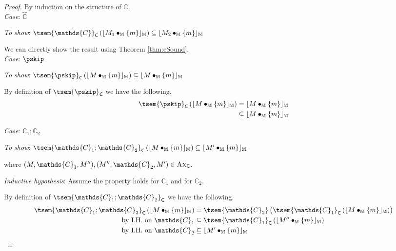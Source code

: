 {\parindent0pt
\begin{proof}
By induction on the structure of $\mathds{C}$. \\

\textit{Case}: $\mathds{\hat{C}}$

\textit{To show}: $\tsem{\hat{\mathds{C}}}_\mathsf{C} \left( \lfloor M_1 \bullet_\mathbb{M} \{m\} \rfloor_\mathbb{M} \right) \subseteq \lfloor M_2 \bullet_\mathbb{M} \{m\} \rfloor_\mathbb{M}$

We can directly show the result using Theorem \ref{thm:eSound}. \\

\textit{Case}: $\pskip$

\textit{To show}: $\tsem{\pskip}_\mathsf{C} \left( \lfloor M \bullet_\mathbb{M} \{m\} \rfloor_\mathbb{M} \right) \subseteq \lfloor M \bullet_\mathbb{M} \{m\} \rfloor_\mathbb{M}$

By definition of $\tsem{\pskip}_\mathsf{C}$ we have the following.
\begin{align*}
	\tsem{\pskip}_\mathsf{C} \left( \lfloor M \bullet_\mathbb{M} \{m\} \rfloor_\mathbb{M} \right)
	&=
	\lfloor M \bullet_\mathbb{M} \{m\} \rfloor_\mathbb{M}
	\\
	&\subseteq \lfloor M \bullet_\mathbb{M} \{m\} \rfloor_\mathbb{M}
\end{align*} 

\textit{Case}: $\mathds{C}_1 ; \mathds{C}_2$

\textit{To show}: $\tsem{\mathds{C}_1 ; \mathds{C}_2}_\mathsf{C} \left( \lfloor M \bullet_\mathbb{M} \{m\} \rfloor_\mathbb{M} \right) \subseteq \lfloor M' \bullet_\mathbb{M} \{m\} \rfloor_\mathbb{M}$

where $(M, \mathds{C}_1, M''), (M'', \mathds{C}_2, M') \in \textsc{Ax}_\mathsf{C}$.

\textit{Inductive hypothesis}: Assume the property holds for $\mathds{C}_1$ and for $\mathds{C}_2$.

By definition of $\tsem{\mathds{C}_1 ; \mathds{C}_2}_\mathsf{C}$ we have the following.
\begin{align*}
	\tsem{\mathds{C}_1 ; \mathds{C}_2}_\mathsf{C} \left( \lfloor M \bullet_\mathbb{M} \{m\} \rfloor_\mathbb{M} \right)
	&=
	\tsem{\mathds{C}_2}\left( \tsem{\mathds{C}_1}_\mathsf{C} \left( \lfloor M \bullet_\mathbb{M} \{m\} \rfloor_\mathbb{M} \right) \right) \\
	\text{by I.H. on } \mathds{C}_1 &\subseteq
	\tsem{\mathds{C}_1}_\mathsf{C} \left( \lfloor M'' \bullet_\mathbb{M} \{m\} \rfloor_\mathbb{M} \right) \\
	\text{by I.H. on } \mathds{C}_2 &\subseteq
	\lfloor M' \bullet_\mathbb{M} \{m\} \rfloor_\mathbb{M}
\end{align*}


\end{proof}}
